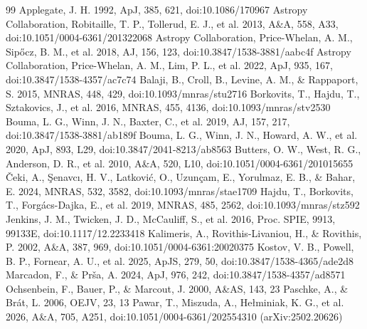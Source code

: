 \documentclass{aa}
\begin{document}
\begin{thebibliography}{99}
 Applegate, J. H. 1992, ApJ, 385, 621, doi:10.1086/170967
 Astropy Collaboration, Robitaille, T. P., Tollerud, E. J., et al. 2013, A\&A, 558, A33, doi:10.1051/0004-6361/201322068
 Astropy Collaboration, Price-Whelan, A. M., Sipőcz, B. M., et al. 2018, AJ, 156, 123, doi:10.3847/1538-3881/aabc4f
 Astropy Collaboration, Price-Whelan, A. M., Lim, P. L., et al. 2022, ApJ, 935, 167, doi:10.3847/1538-4357/ac7c74
 Balaji, B., Croll, B., Levine, A. M., \& Rappaport, S. 2015, MNRAS, 448, 429, doi:10.1093/mnras/stu2716
 Borkovits, T., Hajdu, T., Sztakovics, J., et al. 2016, MNRAS, 455, 4136, doi:10.1093/mnras/stv2530
 Bouma, L. G., Winn, J. N., Baxter, C., et al. 2019, AJ, 157, 217, doi:10.3847/1538-3881/ab189f
 Bouma, L. G., Winn, J. N., Howard, A. W., et al. 2020, ApJ, 893, L29, doi:10.3847/2041-8213/ab8563
 Butters, O. W., West, R. G., Anderson, D. R., et al. 2010, A\&A, 520, L10, doi:10.1051/0004-6361/201015655
 Čeki, A., Şenavcı, H. V., Latković, O., Uzunçam, E., Yorulmaz, E. B., \& Bahar, E. 2024, MNRAS, 532, 3582, doi:10.1093/mnras/stae1709
 Hajdu, T., Borkovits, T., Forgács-Dajka, E., et al. 2019, MNRAS, 485, 2562, doi:10.1093/mnras/stz592
 Jenkins, J. M., Twicken, J. D., McCauliff, S., et al. 2016, Proc. SPIE, 9913, 99133E, doi:10.1117/12.2233418
 Kalimeris, A., Rovithis-Livaniou, H., \& Rovithis, P. 2002, A\&A, 387, 969, doi:10.1051/0004-6361:20020375
 Kostov, V. B., Powell, B. P., Fornear, A. U., et al. 2025, ApJS, 279, 50, doi:10.3847/1538-4365/ade2d8
 Marcadon, F., \& Prša, A. 2024, ApJ, 976, 242, doi:10.3847/1538-4357/ad8571
 Ochsenbein, F., Bauer, P., \& Marcout, J. 2000, A\&AS, 143, 23
 Paschke, A., \& Brát, L. 2006, OEJV, 23, 13
 Pawar, T., Miszuda, A., Hełminiak, K. G., et al. 2026, A\&A, 705, A251, doi:10.1051/0004-6361/202554310 (arXiv:2502.20626)

\end{thebibliography}
\end{document}
